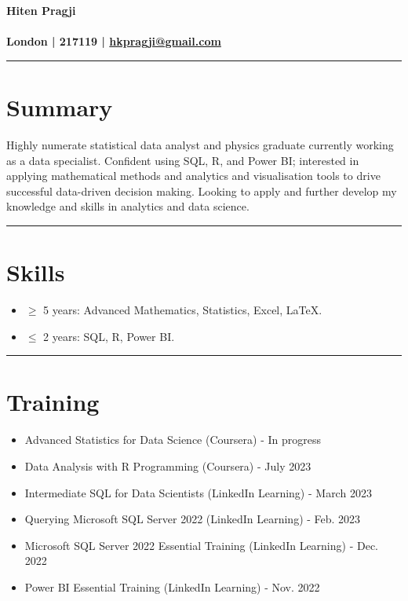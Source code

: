 \documentclass[10pt,a4paper]{article}
\begin{document}
\begin{center}
{\bf \Large Hiten Pragji\\} \href{https://www.linkedin.com/in/hkpragji/} \faLinkedin \space \href{https://github.com/hkpragji} \faGithub \\
\textbf{\faLocationArrow \space London |  \faPhone {} 217119 | \faEnvelope \space \href{mailto:hkpragji@gmail.com}{hkpragji@gmail.com}}
\end{center}

\hrule

\section*{\faUser\space\bf Summary}
\noindent Highly numerate statistical data analyst and physics graduate currently working as a data specialist. Confident using SQL, R, and Power BI; interested in applying mathematical methods and analytics and visualisation tools to drive successful data-driven decision making. Looking to apply and further develop my knowledge and skills in analytics and data science.\\

\hrule

\section*{\faCog\space\bf Skills}
\begin{itemize}[leftmargin=*,align=left]
\normalfont
\item $\geq$ 5 years: Advanced Mathematics, Statistics, Excel, LaTeX.
\item $\leq$ 2 years: SQL, R, Power BI.
\end{itemize}

\hrule

\section*{\faLaptop\space\bf Training}

\begin{itemize}[leftmargin=*,align=left]
\normalfont
\item Advanced Statistics for Data Science (Coursera) - In progress
\item Data Analysis with R Programming (Coursera) - July 2023
\item Intermediate SQL for Data Scientists (LinkedIn Learning) - March 2023
\item Querying Microsoft SQL Server 2022 (LinkedIn Learning) - Feb. 2023
\item Microsoft SQL Server 2022 Essential Training (LinkedIn Learning) - Dec. 2022
\item Power BI Essential Training (LinkedIn Learning) - Nov. 2022
\end{itemize}
\end{document}

